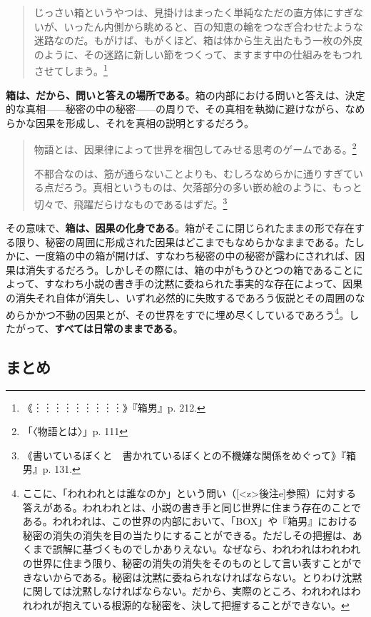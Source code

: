 \documentclass[b5j,twoside,twocolumn]{utarticle}
\begin{document}
\begin{quotation}
じっさい箱というやつは、見掛けはまったく単純なただの直方体にすぎないが、いったん内側から眺めると、百の知恵の輪をつなぎ合わせたような迷路なのだ。もがけば、もがくほど、箱は体から生え出たもう一枚の外皮のように、その迷路に新しい節をつくって、ますます中の仕組みをもつれさせてしまう。\footnote{《︙︙︙︙︙︙︙︙︙》『箱男』p. 212.}	
\end{quotation}

\textbf{箱は、だから、問いと答えの場所である}。箱の内部における問いと答えは、決定的な真相------秘密の中の秘密------の周りで、その真相を執拗に避けながら、なめらかな因果を形成し、それを真相の説明とするだろう。

\begin{quotation}
物語とは、因果律によって世界を梱包してみせる思考のゲームである。\footnote{「〈物語とは〉」p. 111}

不都合なのは、筋が通らないことよりも、むしろなめらかに通りすぎている点だろう。真相というものは、欠落部分の多い嵌め絵のように、もっと切々で、飛躍だらけなものであるはずだ。\footnote{《書いているぼくと　書かれているぼくとの不機嫌な関係をめぐって》『箱男』p. 131.}
\end{quotation}

その意味で、\textbf{箱は、因果の化身である}。箱がそこに閉じられたままの形で存在する限り、秘密の周囲に形成された因果はどこまでもなめらかなままである。たしかに、一度箱の中の箱が開けば、すなわち秘密の中の秘密が露わにされれば、因果は消失するだろう。しかしその際には、箱の中がもうひとつの箱であることによって、すなわち小説の書き手の沈黙に委ねられた事実的な存在によって、因果の消失それ自体が消失し、いずれ必然的に失敗するであろう仮説とその周囲のなめらかかつ不動の因果とが、その世界をすでに埋め尽くしているであろう\footnote{ここに、「われわれとは誰なのか」という問い（[\pbox<z>{後注e}]参照）に対する答えがある。われわれとは、小説の書き手と同じ世界に住まう存在のことである。われわれは、この世界の内部において、「BOX」や『箱男』における秘密の消失の消失を目の当たりにすることができる。ただしその把握は、あくまで誤解に基づくものでしかありえない。なぜなら、われわれはわれわれの世界に住まう限り、秘密の消失の消失をそのものとして言い表すことができないからである。秘密は沈黙に委ねられなければならない。とりわけ沈黙に関しては沈黙しなければならない。だから、実際のところ、われわれはわれわれが抱えている根源的な秘密を、決して把握することができない。}。したがって、\textbf{すべては日常のままである}。

\subsection*{まとめ}
\end{document}
